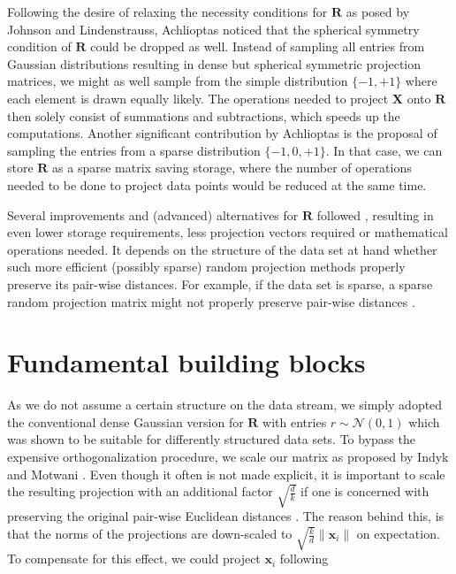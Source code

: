 \vspace{0.2cm}
Following the desire of relaxing the necessity conditions for $\mathbf{R}$ as posed by Johnson and Lindenstrauss, Achlioptas \cite{achlioptas2003database} noticed that the spherical symmetry condition of $\mathbf{R}$ could be dropped as well. Instead of sampling all entries from Gaussian distributions resulting in dense but spherical symmetric projection matrices, we might as well sample from the simple distribution $\{-1,+1\}$ where each element is drawn equally likely. The operations needed to project $\mathbf{X}$ onto $\mathbf{R}$ then solely consist of summations and subtractions, which speeds up the computations. Another significant contribution by Achlioptas is the proposal of sampling the entries from a sparse distribution $\{-1,0,+1\}$. In that case, we can store $\mathbf{R}$ as a sparse matrix saving storage, where the number of operations needed to be done to project data points would be reduced at the same time. 

Several improvements and (advanced) alternatives for $\mathbf{R}$ followed \cite{li2006very,ailon2009fast,krahmer2011new,clarkson2013low}, resulting in even lower storage requirements, less projection vectors required or mathematical operations needed.
It depends on the structure of the data set at hand whether such more efficient (possibly sparse) random projection methods properly preserve its pair-wise distances. For example, if the data set is sparse, a sparse random projection matrix might not properly preserve pair-wise distances \cite{venkatasubramanian2011johnson}. 

\vspace{0.2cm}
\section{Fundamental building blocks}
\label{sec:method_elements}

As we do not assume a certain structure on the data stream, we simply adopted the conventional dense Gaussian version for $\mathbf{R}$ with entries $r \sim \mathcal{N}(0,1)$ which was shown to be suitable for differently structured data sets. To bypass the expensive orthogonalization procedure, we scale our matrix as proposed by Indyk and Motwani \cite{indyk1998approximate}. 
Even though it often is not made explicit, it is important to scale the resulting projection with an additional factor $\sqrt{\frac{d}{k}}$ if one is concerned with preserving the original pair-wise Euclidean distances \cite{bingham2001random}. The reason behind this, is that the norms of the projections are down-scaled to $\sqrt{\frac{k}{d}}\|\mathbf{x}_i\|$ on expectation. To compensate for this effect, we could project $\mathbf{x}_i$ following

